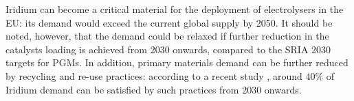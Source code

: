 Iridium can become a critical material for the deployment of electrolysers in the EU: its demand would exceed
the current global supply by 2050. It should be noted, however, that the demand could be relaxed if further
reduction in the catalysts loading is achieved from 2030 onwards, compared to the SRIA 2030 targets for PGMs.
In addition, primary materials demand can be further reduced by recycling and re-use practices: according to a
recent study \cite{worldbank2022hydrogen}, around 40\% of Iridium demand can be satisfied by such practices from 2030 onwards.

~\cite{jrc2023supplychain}